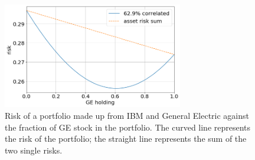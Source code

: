 \begin{figure}[htb]
\centering
\includegraphics[width=0.7\textwidth]{figures/diversification}
\caption{Risk of a portfolio made up from IBM and General Electric against the fraction of GE stock in the portfolio. The curved line represents the risk of the portfolio; the straight line represents the sum of the two single risks.}
\label{fig:diversification}
\end{figure}

%
%

%

